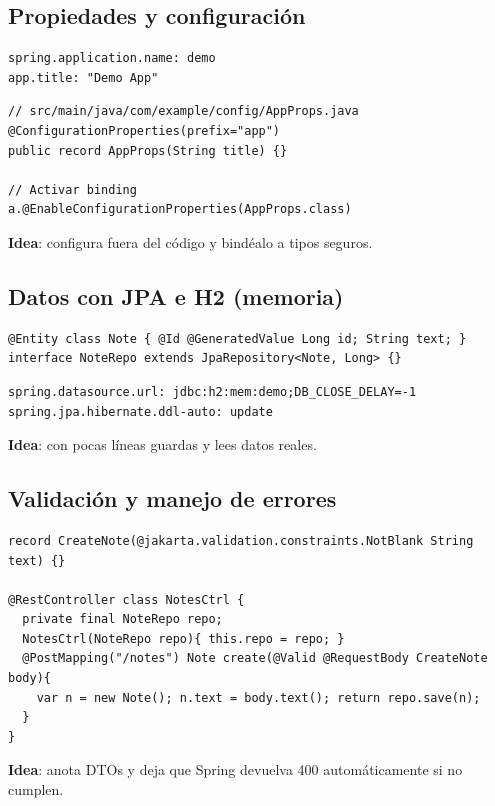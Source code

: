 \documentclass[11pt,a4paper]{article}
\begin{document}
\subsection{Propiedades y configuración}
\begin{lstlisting}[style=yamlstyle, caption={application.yml}]
spring.application.name: demo
app.title: "Demo App"
\end{lstlisting}
\begin{lstlisting}[style=javastyle, caption={ConfigurationProperties tipado}] 
// src/main/java/com/example/config/AppProps.java
@ConfigurationProperties(prefix="app")
public record AppProps(String title) {}

// Activar binding
a.@EnableConfigurationProperties(AppProps.class)
\end{lstlisting}
\textbf{Idea}: configura fuera del código y bindéalo a tipos seguros.

\subsection{Datos con JPA e H2 (memoria)}
\begin{lstlisting}[style=javastyle, caption={Entidad y repositorio}] 
@Entity class Note { @Id @GeneratedValue Long id; String text; }
interface NoteRepo extends JpaRepository<Note, Long> {}
\end{lstlisting}
\begin{lstlisting}[style=yamlstyle, caption={BD en memoria para desarrollo}]
spring.datasource.url: jdbc:h2:mem:demo;DB_CLOSE_DELAY=-1
spring.jpa.hibernate.ddl-auto: update
\end{lstlisting}
\textbf{Idea}: con pocas líneas guardas y lees datos reales.

\subsection{Validación y manejo de errores}
\begin{lstlisting}[style=javastyle, caption={Validar entrada y responder 400}] 
record CreateNote(@jakarta.validation.constraints.NotBlank String text) {}

@RestController class NotesCtrl {
  private final NoteRepo repo;
  NotesCtrl(NoteRepo repo){ this.repo = repo; }
  @PostMapping("/notes") Note create(@Valid @RequestBody CreateNote body){
    var n = new Note(); n.text = body.text(); return repo.save(n);
  }
}
\end{lstlisting}
\textbf{Idea}: anota DTOs y deja que Spring devuelva 400 automáticamente si no cumplen.
\end{document}
